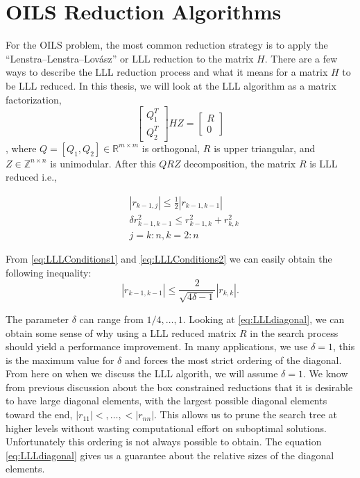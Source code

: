 \documentclass[12pt,Bold,letterpaper]{mcgilletdclass}
\newcommand{\vsp}{\vspace{\baselineskip}}
\begin{document}
\vsp \section{OILS Reduction Algorithms}
For the OILS problem, the most common reduction strategy is to apply the ``Lenstra–Lenstra–Lovász'' or LLL reduction \cite{LenLL82} to the matrix $H$. There are a few ways to describe the LLL reduction process and what it means for a matrix $H$ to be LLL reduced. In this thesis, we will look at the LLL algorithm as a matrix factorization, 
$$\begin{bmatrix}
Q_1^T\\ 
Q_2^T
\end{bmatrix}
HZ = 
\begin{bmatrix}
R\\ 
0
\end{bmatrix}$$,
where $Q = [Q_1, Q_2] \in \mathbb{R}^{m \times m} $ is orthogonal, $R$ is upper triangular, and $Z \in \mathbb{Z}^{n \times n}$ is unimodular. After this $QRZ$ decomposition, the matrix $R$ is LLL reduced i.e.,

\begin{align} \label{eq:LLLConditions1}
&\left | r_{k-1,j} \right | \le \frac{1}{2} \left | r_{k-1,k-1} \right | \\
\label{eq:LLLConditions2}
&\delta r_{k-1,k-1}^2 \le r_{k-1,k}^2 + r_{k,k}^2 \\
&j = k:n, k=2:n
\end{align}

From \eqref{eq:LLLConditions1} and \eqref{eq:LLLConditions2} we can easily obtain the following inequality:
\begin{equation} \label{eq:LLLdiagonal}
\left | r_{k-1,k-1} \right | \le \frac{2}{\sqrt{4\delta -1}}\left | r_{k,k} \right |.
\end{equation}

The parameter $\delta$ can range from $1/4, \dots , 1$. Looking at \eqref{eq:LLLdiagonal}, we can obtain some sense of why using a LLL reduced matrix $R$ in the search process should yield a performance improvement. In many applications, we use $\delta=1$, this is the maximum value for $\delta$ and forces the most strict ordering of the diagonal. From here on when we discuss the LLL algorith, we will assume $\delta = 1$. We know from previous discussion about the box constrained reductions that it is desirable to have large diagonal elements, with the largest possible diagonal elements toward the end, $|r_{11}| <, \dots,< |r_{nn}|$. This allows us to prune the search tree at higher levels without wasting computational effort on suboptimal solutions. Unfortunately this ordering is not always possible to obtain. The equation \eqref{eq:LLLdiagonal} gives us a guarantee about the relative sizes of the diagonal elements.
\end{document}
